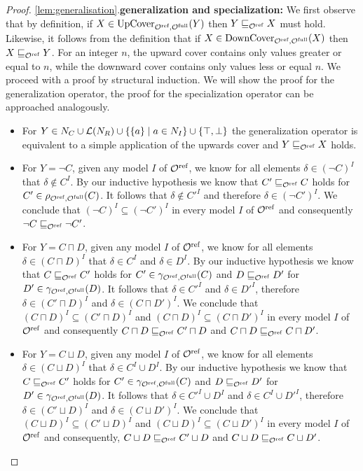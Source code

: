 \begin{proof}
  \item \ref{lem:generalisation}.\enspace \textbf{generalization and specialization:\enspace}
  We first observe that by definition, if $X \in {\ensuremath{\operatorname{UpCover}}}_{{\mathcal{O}^\textnormal{ref}},{\mathcal{O}^\textnormal{full}}}(Y)$ then $Y \sqsubseteq_{\mathcal{O}^\textnormal{ref}} X$ must hold. Likewise, it follows from the definition that if $X \in {\ensuremath{\operatorname{DownCover}}}_{{\mathcal{O}^\textnormal{ref}},{\mathcal{O}^\textnormal{full}}}(X)$ then $X \sqsubseteq_{\mathcal{O}^\textnormal{ref}} Y$. For an integer $n$, the upward cover contains only values greater or equal to $n$, while the downward cover contains only values less or equal $n$. We proceed with a proof by structural induction. We will show the proof for the generalization operator, the proof for the specialization operator can be approached analogously.
  \begin{itemize}
    \item For $Y \in N_C \cup \mathcal{L}(N_R) \cup \{ \{a\} \mid a \in N_I \} \cup \{ \top, \bot \}$ the generalization operator is equivalent to a simple application of the upwards cover and $Y \sqsubseteq_{\mathcal{O}^\textnormal{ref}} X$ holds.
    \item For $Y = \lnot C$, given any model $I$ of ${\mathcal{O}^\textnormal{ref}}$, we know for all elements $\delta \in (\lnot C)^I$ that $\delta \not\in C^I$. By our inductive hypothesis we know that $C' \sqsubseteq_{\mathcal{O}^\textnormal{ref}} C$ holds for $C' \in \rho_{{\mathcal{O}^\textnormal{ref}},{\mathcal{O}^\textnormal{full}}}(C)$. It follows that $\delta \not\in C'^I$ and therefore $\delta \in (\lnot C')^I$. We conclude that $(\lnot C)^I \subseteq (\lnot C')^I$ in every model $I$ of ${\mathcal{O}^\textnormal{ref}}$ and consequently $\lnot C \sqsubseteq_{\mathcal{O}^\textnormal{ref}} \lnot C'$.
    \item For $Y = C \sqcap D$, given any model $I$ of ${\mathcal{O}^\textnormal{ref}}$, we know for all elements $\delta \in (C \sqcap D)^I$ that $\delta \in C^I$ and $\delta \in D^I$. By our inductive hypothesis we know that $C \sqsubseteq_{\mathcal{O}^\textnormal{ref}} C'$ holds for $C' \in \gamma_{{\mathcal{O}^\textnormal{ref}},{\mathcal{O}^\textnormal{full}}}(C)$ and $D \sqsubseteq_{\mathcal{O}^\textnormal{ref}} D'$ for $D' \in \gamma_{{\mathcal{O}^\textnormal{ref}},{\mathcal{O}^\textnormal{full}}}(D)$. It follows that $\delta \in C'^I$ and $\delta \in D'^I$, therefore $\delta \in (C' \sqcap D)^I$ and $\delta \in (C \sqcap D')^I$. We conclude that $(C \sqcap D)^I \subseteq (C' \sqcap D)^I$ and $(C \sqcap D)^I \subseteq (C \sqcap D')^I$ in every model $I$ of ${\mathcal{O}^\textnormal{ref}}$ and consequently $C \sqcap D \sqsubseteq_{\mathcal{O}^\textnormal{ref}} C' \sqcap D$ and $C \sqcap D \sqsubseteq_{\mathcal{O}^\textnormal{ref}} C \sqcap D'$.
    \item For $Y = C \sqcup D$, given any model $I$ of ${\mathcal{O}^\textnormal{ref}}$, we know for all elements $\delta \in (C \sqcup D)^I$ that $\delta \in C^I \cup D^I$. By our inductive hypothesis we know that $C \sqsubseteq_{\mathcal{O}^\textnormal{ref}} C'$ holds for $C' \in \gamma_{{\mathcal{O}^\textnormal{ref}},{\mathcal{O}^\textnormal{full}}}(C)$ and $D \sqsubseteq_{\mathcal{O}^\textnormal{ref}} D'$ for $D' \in \gamma_{{\mathcal{O}^\textnormal{ref}},{\mathcal{O}^\textnormal{full}}}(D)$. It follows that $\delta \in C'^I \cup D^I$ and $\delta \in C^I \cup D'^I$, therefore $\delta \in (C' \sqcup D)^I$ and $\delta \in (C \sqcup D')^I$. We conclude that $(C \sqcup D)^I \subseteq (C' \sqcup D)^I$ and $(C \sqcup D)^I \subseteq (C \sqcup D')^I$ in every model $I$ of ${\mathcal{O}^\textnormal{ref}}$ and consequently, $C \sqcup D \sqsubseteq_{\mathcal{O}^\textnormal{ref}} C' \sqcup D$ and $C \sqcup D \sqsubseteq_{\mathcal{O}^\textnormal{ref}} C \sqcup D'$.

\end{itemize}
\end{proof}
